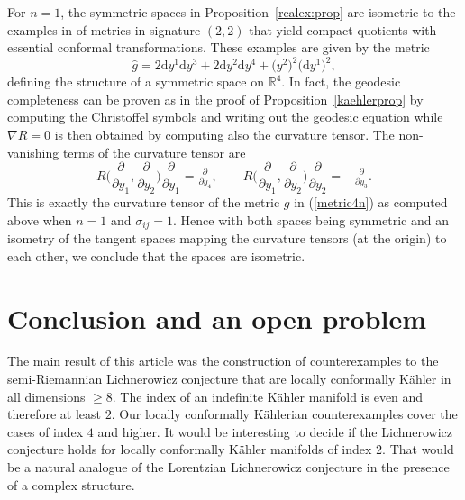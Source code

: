 \documentclass[pdftex]{sigma}
\numberwithin{equation}{section}
\newcommand{\1}{\mathbf{1}}
\renewcommand{\d}{{\mathrm d}}
\newcommand{\+}{\oplus}
\newcommand{\del}{\partial}
\renewcommand{\=}{\equiv}
\newcommand{\R}{\mathbb{R}}
\begin{document}
For $n=1$, the symmetric spaces in Proposition~\ref{realex:prop} are isometric to the examples in \cite{frances12} of metrics in signature $(2,2)$ that yield compact quotients with essential conformal transformations. These examples are given by the metric
\begin{equation}\label{Francesmetric} \hat g= 2\d y^1 \d y^3 + 2\d y^2 \d y^4 + {\bigl(y^2\bigr)^2}\bigl(\d y^1\bigr)^2,\end{equation}
defining the structure of a symmetric space on $\R^4$. In fact, the geodesic completeness
can be proven as in the proof of Proposition~\ref{kaehlerprop} by computing the Christoffel symbols and writing out the geodesic equation
while $\nabla R=0$ is then obtained by computing also the curvature tensor.
The non-vanishing terms of the curvature tensor are
\[
R\biggl(\frac{\del}{\del y_{1}},\frac{\del}{\del y_{2}}\biggr)\frac{\del}{\del y_{1}}=\tfrac{\del}{\del y_{4}},\qquad R\biggl(\frac{\del}{\del y_{1}},\frac{\del}{\del y_{2}}\biggr)\frac{\del}{\del y_{2}}={-\tfrac{\del}{\del y_{3}}}.
\]
This is exactly the curvature tensor of the metric $g$ in (\ref{metric4n}) as computed above when
 $n=1$ and $\sigma_{ij}=1$. Hence with both spaces being symmetric and an isometry of the tangent spaces
 mapping the curvature tensors (at the origin) to each other, we conclude that the spaces are isometric.


\section{Conclusion and an open problem}
The main result of this article was the construction of counterexamples to the semi-Riemannian Lichnerowicz conjecture
that are locally conformally K\"ahler in all dimensions $\ge 8$. The index of an indefinite K\"ahler manifold is even and therefore
at least $2$. Our locally conformally K\"ahlerian counterexamples cover the cases of index $4$ and higher. It would be interesting to
decide if the Lichnerowicz conjecture holds for locally conformally K\"ahler manifolds of index $2$. That would be a natural analogue of the
Lorentzian Lichnerowicz conjecture in the presence of a complex structure.
\end{document}
